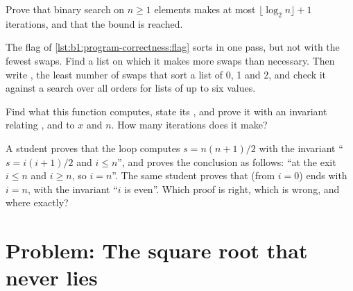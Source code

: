 \begin{exercise}[$\star\star$]\label{exo:b1:program-correctness:9}
Prove that binary search on $n \geq 1$ elements makes at most $\lfloor \log_2 n \rfloor + 1$ iterations, and that the
bound is reached.
\end{exercise}

\begin{exercise}[$\star\star\star$]\label{exo:b1:program-correctness:10}
The flag of \cref{lst:b1:program-correctness:flag} sorts in one pass, but not with the fewest swaps. Find a list on which
it makes more swaps than necessary. Then write , the least number of swaps that sort a list of 0, 1
and 2, and check it against a search over all orders for lists of up to six values.
\end{exercise}

\begin{exercise}[$\star\star\star$]\label{exo:b1:program-correctness:11}
Find what this function computes, state its , and prove it  with an invariant relating
,  and  to $x$ and $n$. How many iterations does it make?
\end{exercise}

\begin{exercise}[$\star\star\star$]\label{exo:b1:program-correctness:12}
A student proves that the loop  computes $s = n(n + 1)/2$ with the
invariant ``$s = i(i + 1)/2$ and $i \leq n$'', and proves the conclusion as follows: ``at the exit $i \leq n$ and $i \geq n$,
so $i = n$''. The same student proves that  (from $i = 0$) ends with $i = n$, with the
invariant ``$i$ is even''. Which proof is right, which is wrong, and where exactly?
\end{exercise}

\section{Problem: The square root that never lies}\label{sec:b1:program-correctness:problem}

